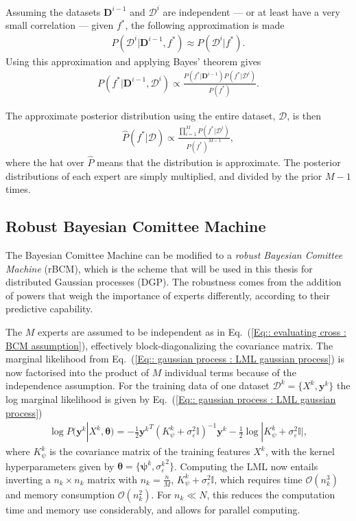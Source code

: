 \documentclass[twoside,english]{uiofysmaster}
\begin{document}
{{Assuming the datasets $\textbf{D}^{i-1}$ and $\mathcal{D}^i$ are independent --- or at least have a very small correlation --- given $f^*$, the following approximation is made
\begin{align}\label{Eq:: evaluating cross : BCM assumption}
P(\mathcal{D}^i | \textbf{D}^{i-1},f^*) \approx P(\mathcal{D}^i | f^*).
\end{align}
Using this approximation and applying Bayes' theorem gives
\begin{align}
P(f^* | \textbf{D}^{i-1}, \mathcal{D}^i) \propto \frac{P(f^*|\textbf{D}^{i-1}) P(f^* | \mathcal{D}^i)}{P(f^*)}. 
\end{align}

The approximate posterior distribution using the entire dataset, $\mathcal{D}$, is then 
\begin{align}\label{Eq:: evaluating cross : BCM predictive distribution}
\hat{P}(f^* | \mathcal{D}) \propto \frac{\prod_{i=1}^M P(f^*| \mathcal{D}^i)}{P(f^* )^{M-1}} ,
\end{align}
where the hat over $\hat{P}$ means that the distribution is approximate. The posterior distributions of each expert are simply multiplied, and divided by the prior $M-1$ times.

\subsection{Robust Bayesian Comittee Machine}

The Bayesian Comittee Machine can be modified to a \textit{robust Bayesian Comittee Machine} (rBCM), which is the scheme that will be used in this thesis for distributed Gaussian processes (DGP). The robustness comes from the addition of powers that weigh the importance of experts differently, according to their predictive capability. 

The $M$ experts are assumed to be independent \cite{deisenroth2015distributed} as in Eq.~(\ref{Eq:: evaluating cross : BCM assumption}), effectively block-diagonalizing the covariance matrix. The marginal likelihood from Eq.~(\ref{Eq:: gaussian process : LML gaussian process}) is now factorised into the product of $M$ individual terms because of the independence assumption. For the training data of one dataset $\mathcal{D}^k = \{X^k, \textbf{y}^k \}$ the log marginal likelihood is given by Eq.~(\ref{Eq:: gaussian process : LML gaussian process})
\begin{align}
\log P(\textbf{y}^k|X^k, \boldsymbol{\theta}) = - \frac{1}{2} {\textbf{y}^k}^T (K_{\psi}^k + \sigma_{\varepsilon}^2 \mathbb{I})^{-1}\textbf{y}^k - \frac{1}{2} \log
 |K_{\psi}^k + \sigma_{\varepsilon}^2 \mathbb{I} |,
\end{align}
where $K_{\psi}^k$ is the covariance matrix of the training features $X^k$, with the kernel hyperparameters given by $\boldsymbol{\theta} = \{ \boldsymbol{\psi}^k, {\sigma_{\varepsilon}^k}^2 \}$. Computing the LML now entails inverting a $n_k \times n_k$ matrix with $n_k = \frac{n}{M}$, $K_{\psi}^{k} + \sigma_{\varepsilon}^2 \mathbb{I}$, which requires time $\mathcal{O}(n_k^3)$ and memory consumption $\mathcal{O}(n_k^2)$. For $n_k \ll N$, this reduces the computation time and memory use considerably, and allows for parallel computing. 

}}
\end{document}

